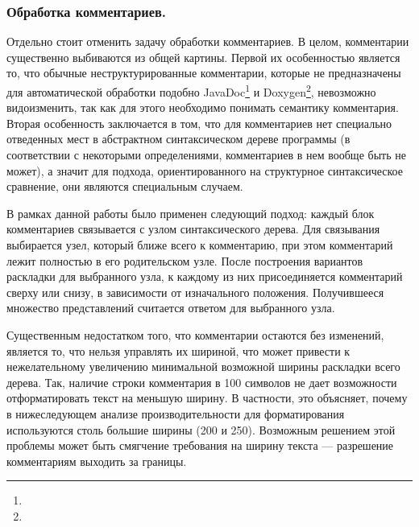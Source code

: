 


\subsubsection{Обработка комментариев.}

Отдельно стоит отменить задачу обработки комментариев. В целом, комментарии
существенно выбиваются из общей картины. Первой их особенностью является то,
что обычные неструктурированные комментарии, которые не
предназначены для автоматической обработки подобно
JavaDoc\footnote{}
и Doxygen\footnote{},
невозможно видоизменить, так как для этого необходимо понимать семантику
комментария. Вторая особенность заключается в том, что для комментариев нет
специально отведенных мест в абстрактном синтаксическом дереве программы
(в соответствии с некоторыми определениями, комментариев в нем вообще быть не может),
а значит для подхода, ориентированного на структурное синтаксическое сравнение, они
являются специальным случаем.

В рамках данной работы было применен следующий подход: каждый блок комментариев
связывается с узлом синтаксического дерева. Для связывания выбирается узел, который
ближе всего к комментарию, при этом комментарий лежит полностью в его родительском узле.
После построения вариантов раскладки для выбранного узла, к каждому из них
присоединяется комментарий сверху или снизу, в зависимости от изначального положения.
Получившееся множество представлений считается ответом для выбранного узла.

Существенным недостатком того, что комментарии остаются без изменений,
является то, что нельзя управлять их шириной, что может привести к нежелательному
увеличению минимальной возможной ширины раскладки всего дерева.
Так, наличие строки комментария в
100 символов не дает возможности отформатировать текст на меньшую ширину.
В частности, это объясняет, почему в нижеследующем анализе производительности для
форматирования используются столь большие ширины (200 и 250). Возможным решением
этой проблемы может быть смягчение требования на ширину текста --- разрешение
комментариям выходить за границы.

